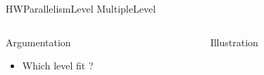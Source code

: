 %
\begin{Frame}{HWParallelismLevel MultipleLevel}

  \begin{columns}[t]
    \begin{column}{\HW} %
      \begin{block}{Argumentation}
        \begin{itemize}
        \item Which level fit ?
        \end{itemize}
      \end{block} 
    \end{column}
    
    \begin{column}{\HW} %
      \begin{block}{Illustration}
      \end{block}   
    \end{column}
  \end{columns}  
\end{Frame}


